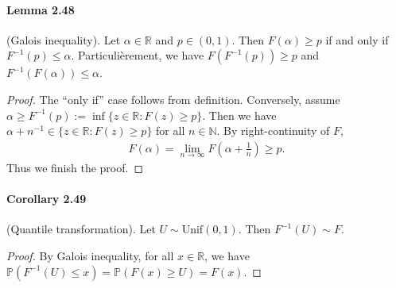 \documentclass{article}
\numberwithin{equation}{section}
\renewcommand{\P}{\mathbb{P}}
\theoremstyle{plain}
\theoremstyle{definition}
\begin{document}
\paragraph{Lemma 2.48\label{lemma:2.48}} (Galois inequality). Let $\alpha\in\mathbb{R}$ and $p\in(0,1)$. Then $F(\alpha)\geq p$ if and only if $F^{-1}(p)\leq\alpha$. Particulièrement, we have $F(F^{-1}(p))\geq p$ and $F^{-1}(F(\alpha))\leq\alpha$.
\begin{proof}
The ``only if'' case follows from definition. Conversely, assume $\alpha\geq F^{-1}(p):=\inf\{z\in\mathbb{R}:F(z)\geq p\}$. Then we have $\alpha+n^{-1}\in\{z\in\mathbb{R}:F(z)\geq p\}$ for all $n\in\mathbb{N}$. By right-continuity of $F$,
\begin{align*}
	F(\alpha)=\lim_{n\to\infty}F\left(\alpha+\frac{1}{n}\right) \geq p.
\end{align*}
Thus we finish the proof.
\end{proof}

\paragraph{Corollary 2.49\label{cor:2.49}} (Quantile transformation). Let $U\sim\mathrm{Unif}(0,1)$. Then $F^{-1}(U)\sim F$.
\begin{proof}
By Galois inequality, for all $x\in\mathbb{R}$,	we have $\P(F^{-1}(U)\leq x) = \P(F(x)\geq U)=F(x).$
\end{proof}
\end{document}
